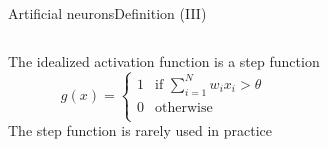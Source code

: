 \documentclass[10pt,compress]{beamer} %
\begin{document}
\begin{frame}{Artificial neurons}{Definition (III)}
	\begin{columns}
	The idealized activation function is a step function
	\begin{equation*}
	g(x) =
	  \begin{cases}
	      1  & \text{if } \sum_{i=1}^{N} w_i x_i > \theta\\
		  0  & \text{otherwise}\\
	  \end{cases}
	\end{equation*}
	The step function is rarely used in practice

 	\end{columns}

\end{frame}
\end{document}
